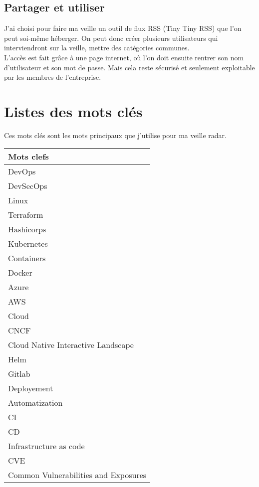 \documentclass[11pt,a4paper,oneside]{book}
\begin{document}
\subsection{Partager et utiliser}

J'ai choisi pour faire ma veille un outil de flux RSS (Tiny Tiny RSS) que l'on peut soi-même héberger.
On peut donc créer plusieurs utilisateurs qui interviendront sur la veille, mettre des catégories communes. \\
L'accès est fait grâce à une page internet, où l'on doit ensuite rentrer son nom d'utilisateur et son mot de passe. Mais cela reste sécurisé et seulement exploitable par les membres de l'entreprise. \\

\newpage

\section{Listes des mots clés}

Ces mots clés sont les mots principaux que j'utilise pour ma veille radar. \\

\begin{tabularx}{14cm}{|X|}
\hline
\rowcolor{gray!30} Mots clefs \\
\hline
DevOps \\
DevSecOps \\
Linux \\
Terraform \\
Hashicorps \\
Kubernetes \\
Containers \\
Docker \\
Azure \\
AWS \\
Cloud \\
CNCF \\
Cloud Native Interactive Landscape \\
Helm \\
Gitlab \\
Deployement \\
Automatization \\
CI \\
CD \\
Infrastructure as code \\
CVE \\
Common Vulnerabilities and Exposures \\
\hline
\end{tabularx}
\end{document}

